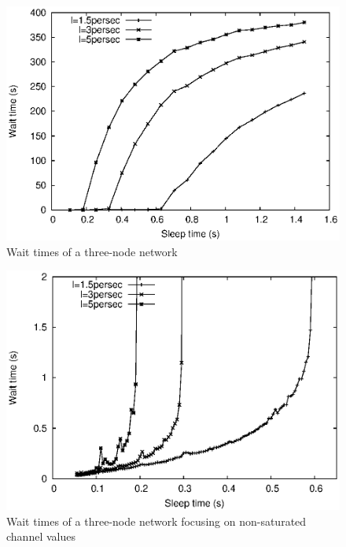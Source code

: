 \begin{figure}[t]
\centering
\includegraphics[scale=0.65]{figures/3node_varySleep_sim_large.eps}
\caption{Wait times of a three-node network}
\label{fig:3nodes_large}
\end{figure}

\begin{figure}[t]
\centering
\includegraphics[scale=0.65]{figures/3node_varySleep_sim_small.eps}
\caption{Wait times of a three-node network focusing on non-saturated channel values}
\label{fig:3nodes_small}
\end{figure}

